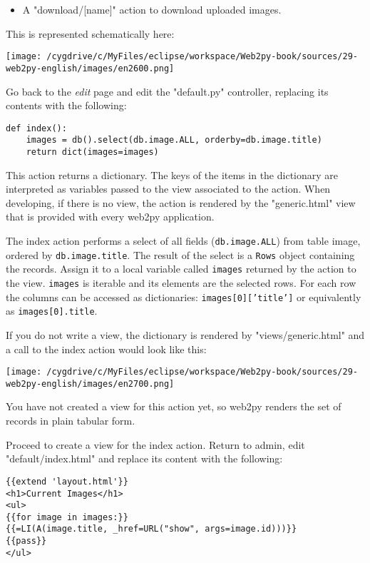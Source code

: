 \documentclass[justified,sixbynine,notoc]{tufte-book}
\def\ft{\small\tt}
\def\inxx#1{\index{#1}}
\begin{document}
\begin{fullwidth}
\begin{itemize}
\item A "download/[name]" action to download uploaded images.
\end{itemize}

This is represented schematically here:


\goodbreak\begin{center}\texttt{[image: /cygdrive/c/MyFiles/eclipse/workspace/Web2py-book/sources/29-web2py-english/images/en2600.png]}\end{center}


Go back to the {\it edit} page and edit the "default.py" controller, replacing its contents with the following:

\inxx{select}
\begin{lstlisting}
def index():
    images = db().select(db.image.ALL, orderby=db.image.title)
    return dict(images=images)
\end{lstlisting}

This action returns a dictionary. The keys of the items in the dictionary are interpreted as variables passed to the view associated to the action. When developing, if there is no view, the action is rendered by the "generic.html" view that is provided with every web2py application.

The index action performs a select of all fields ({\ft db.image.ALL}) from table image, ordered by {\ft db.image.title}. The result of the select is a {\ft Rows} object containing the records. Assign it to a local variable called {\ft images} returned by the action to the view. {\ft images} is iterable and its elements are the selected rows. For each row the columns can be accessed as dictionaries:
{\ft images[0]['title']} or equivalently as {\ft images[0].title}.

If you do not write a view, the dictionary is rendered by "views/generic.html" and a call to the index action would look like this:


\goodbreak\begin{center}\texttt{[image: /cygdrive/c/MyFiles/eclipse/workspace/Web2py-book/sources/29-web2py-english/images/en2700.png]}\end{center}


You have not created a view for this action yet, so web2py renders the set of records in plain tabular form.

Proceed to create a view for the index action. Return to admin, edit "default/index.html" and replace its content with the following:
\begin{lstlisting}[keywords={}]
{{extend 'layout.html'}}
<h1>Current Images</h1>
<ul>
{{for image in images:}}
{{=LI(A(image.title, _href=URL("show", args=image.id)))}}
{{pass}}
</ul>
\end{lstlisting}


\end{fullwidth}
\end{document}
